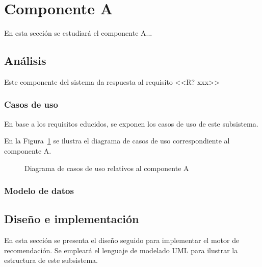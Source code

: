 \section{Componente A}
En esta sección se estudiará el componente A...

\subsection{Análisis}
Este componente del sistema da respuesta al requisito <<R? xxx>> 

\subsubsection{Casos de uso}
En base a los requisitos educidos, se exponen los casos de uso de este subsistema.

En la Figura~\ref{f:dev:use-cases-recsys} se ilustra el diagrama de casos de uso correspondiente al componente A.

\begin{figure}[h!]
\centering
\caption{Diagrama de casos de uso relativos al componente A}
\label{f:dev:use-cases-recsys}
\end{figure}

\subsubsection{Modelo de datos}


\subsection{Diseño e implementación}
En esta sección se presenta el diseño seguido para implementar el motor de recomendación. Se empleará el lenguaje de modelado UML para ilustrar la estructura de este subsistema.
